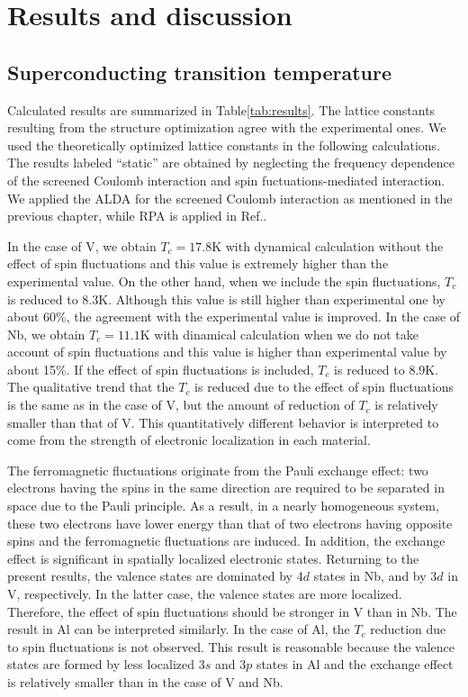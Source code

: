 \section{Results and discussion}
\subsection{Superconducting transition temperature}
Calculated results are summarized in Table\ref{tab:results}.
The lattice constants resulting from the structure optimization agree with the experimental ones.
We used the theoretically optimized lattice constants in the following calculations.
The results labeled ``static'' are obtained by neglecting the frequency dependence of the 
screened Coulomb interaction and spin fuctuations-mediated interaction.
We applied the ALDA for the screened Coulomb interaction as mentioned in the previous chapter, 
while RPA is applied in Ref.\cite{RA2013}.

In the case of V, we obtain $T_c = 17.8$K with dynamical calculation without the effect of
spin fluctuations and this value is extremely higher than the experimental value.
On the other hand, when we include the spin fluctuations, $T_c$ is reduced to $8.3$K.
Although this value is still higher than experimental one by about 60\%, the agreement with 
the experimental value is improved.
In the case of Nb, we obtain $T_c = 11.1$K with dinamical calculation when we do not take account of 
spin fluctuations and this value is higher than experimental value by about 15\%.
If the effect of spin fluctuations is included, $T_c$ is reduced to $8.9$K.
The qualitative trend that the $T_c$ is reduced due to the effect of spin fluctuations is the same as 
in the case of V, but the amount of reduction of $T_c$ is relatively smaller than that of V.
This quantitatively different behavior is interpreted to come from the strength of electronic localization in each material.

The ferromagnetic fluctuations originate from the Pauli exchange effect\cite{Berk1966}: 
two electrons having the spins in the same direction are 
required to be separated in space due to the Pauli principle. As a result, in a 
nearly homogeneous system, these two electrons have lower energy than that of two electrons having 
opposite spins and the ferromagnetic fluctuations are induced.
In addition, the exchange effect is significant in spatially localized electronic states.
Returning to the present results, the valence states are dominated by 4$d$ states in Nb, 
and by 3$d$ in V, respectively. 
In the latter case, the valence states are more localized.
Therefore, the effect of spin fluctuations should be stronger in V than in Nb.
The result in Al can be interpreted similarly. In the case of Al, the $T_c$ reduction due to spin fluctuations
is not observed. This result is reasonable because the valence states are formed by less localized
3$s$ and 3$p$ states in Al and the exchange effect is relatively smaller than in the case of V and Nb.

